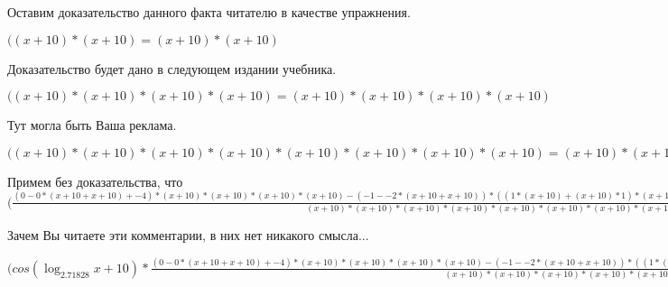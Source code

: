 \documentclass[12pt,a4paper,fleqn]{article}
\theoremstyle{definition}
\begin{document}
Оставим доказательство данного факта читателю в качестве упражнения.

$(( x  +  10 ) * ( x  +  10 ) = ( x  +  10 ) * ( x  +  10 )$

Доказательство будет дано в следующем издании учебника.

$(( x  +  10 ) * ( x  +  10 ) * ( x  +  10 ) * ( x  +  10 ) = ( x  +  10 ) * ( x  +  10 ) * ( x  +  10 ) * ( x  +  10 )$

Тут могла быть Ваша реклама.

$(( x  +  10 ) * ( x  +  10 ) * ( x  +  10 ) * ( x  +  10 ) * ( x  +  10 ) * ( x  +  10 ) * ( x  +  10 ) * ( x  +  10 ) = ( x  +  10 ) * ( x  +  10 ) * ( x  +  10 ) * ( x  +  10 ) * ( x  +  10 ) * ( x  +  10 ) * ( x  +  10 ) * ( x  +  10 )$

Примем без доказательства, что
$(\frac{( 0  -  0  * ( x  +  10  +  x  +  10 ) +  -4 ) * ( x  +  10 ) * ( x  +  10 ) * ( x  +  10 ) * ( x  +  10 ) - ( -1  -  -2  * ( x  +  10  +  x  +  10 )) * (( 1  * ( x  +  10 ) + ( x  +  10 ) *  1 ) * ( x  +  10 ) * ( x  +  10 ) + ( x  +  10 ) * ( x  +  10 ) * ( 1  * ( x  +  10 ) + ( x  +  10 ) *  1 ))}{( x  +  10 ) * ( x  +  10 ) * ( x  +  10 ) * ( x  +  10 ) * ( x  +  10 ) * ( x  +  10 ) * ( x  +  10 ) * ( x  +  10 )}
 = \frac{( 0  -  0  * ( x  +  10  +  x  +  10 ) +  -4 ) * ( x  +  10 ) * ( x  +  10 ) * ( x  +  10 ) * ( x  +  10 ) - ( -1  -  -2  * ( x  +  10  +  x  +  10 )) * (( 1  * ( x  +  10 ) + ( x  +  10 ) *  1 ) * ( x  +  10 ) * ( x  +  10 ) + ( x  +  10 ) * ( x  +  10 ) * ( 1  * ( x  +  10 ) + ( x  +  10 ) *  1 ))}{( x  +  10 ) * ( x  +  10 ) * ( x  +  10 ) * ( x  +  10 ) * ( x  +  10 ) * ( x  +  10 ) * ( x  +  10 ) * ( x  +  10 )}
$

Зачем Вы читаете эти комментарии, в них нет никакого смысла...

$(cos(\log_{ 2.71828 }{ x  +  10 }) * \frac{( 0  -  0  * ( x  +  10  +  x  +  10 ) +  -4 ) * ( x  +  10 ) * ( x  +  10 ) * ( x  +  10 ) * ( x  +  10 ) - ( -1  -  -2  * ( x  +  10  +  x  +  10 )) * (( 1  * ( x  +  10 ) + ( x  +  10 ) *  1 ) * ( x  +  10 ) * ( x  +  10 ) + ( x  +  10 ) * ( x  +  10 ) * ( 1  * ( x  +  10 ) + ( x  +  10 ) *  1 ))}{( x  +  10 ) * ( x  +  10 ) * ( x  +  10 ) * ( x  +  10 ) * ( x  +  10 ) * ( x  +  10 ) * ( x  +  10 ) * ( x  +  10 )}
 = cos(\log_{ 2.71828 }{ x  +  10 }) * \frac{( 0  -  0  * ( x  +  10  +  x  +  10 ) +  -4 ) * ( x  +  10 ) * ( x  +  10 ) * ( x  +  10 ) * ( x  +  10 ) - ( -1  -  -2  * ( x  +  10  +  x  +  10 )) * (( 1  * ( x  +  10 ) + ( x  +  10 ) *  1 ) * ( x  +  10 ) * ( x  +  10 ) + ( x  +  10 ) * ( x  +  10 ) * ( 1  * ( x  +  10 ) + ( x  +  10 ) *  1 ))}{( x  +  10 ) * ( x  +  10 ) * ( x  +  10 ) * ( x  +  10 ) * ( x  +  10 ) * ( x  +  10 ) * ( x  +  10 ) * ( x  +  10 )}
$
\end{document}
